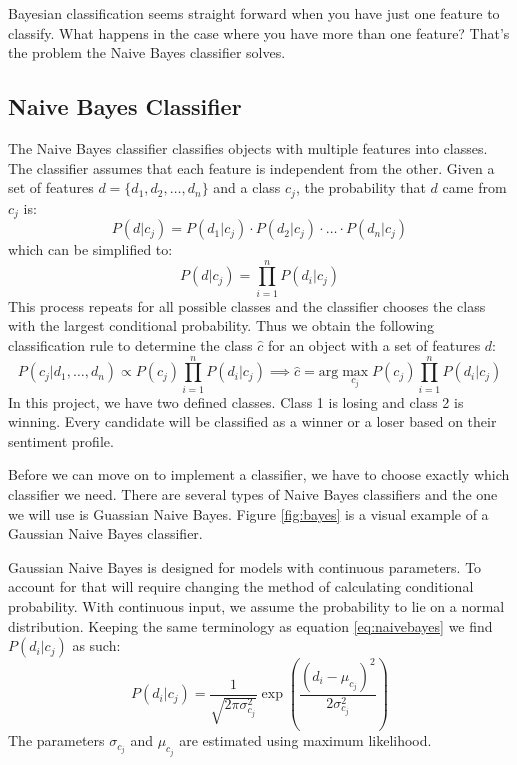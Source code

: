 \documentclass[11pt, twoside, reqno]{book}
\begin{document}
Bayesian classification seems straight forward when you have just one feature to classify. What happens in the case where you have more than one feature? That's the problem the Naive Bayes classifier solves. 

\subsection{Naive Bayes Classifier}
\hspace{0.2in}The Naive Bayes classifier classifies objects with multiple features into classes. The classifier assumes that each feature is independent from the other. Given a set of features $d = \{d_1, d_2, \dots, d_n\}$ and a class $c_j$, the probability that $d$ came from $c_j$ is:
\begin{equation}
\label{eq:naivebayes}
P(d|c_j) = P(d_1|c_j) \cdot P(d_2|c_j) \cdot \ldots \cdot P(d_n|c_j)
\end{equation}
which can be simplified to:
\begin{equation}
\label{eq:simnaivebayes}
P(d|c_j) = \prod^{n}_{i=1} P(d_i|c_j)
\end{equation}
This process repeats for all possible classes and the classifier chooses the class with the largest conditional probability. Thus we obtain the following classification rule to determine the class $\hat{c}$ for an object with a set of features $d$:
\begin{equation}
\label{eq:classrule}
P(c_j | d_1,\dots,d_n) \propto P(c_j) \prod^{n}_{i=1} P(d_i | c_j) \implies \hat{c} = \text{arg}\max_{c_j}P(c_j)\prod^{n}_{i=1}P(d_i | c_j)
\end{equation}
In this project, we have two defined classes. Class 1 is losing and class 2 is winning. Every candidate will be classified as a winner or a loser based on their sentiment profile. 

Before we can move on to implement a classifier, we have to choose exactly which classifier we need. There are several types of Naive Bayes classifiers and the one we will use is Guassian Naive Bayes. Figure \ref{fig:bayes} is a visual example of a Gaussian Naive Bayes classifier. 

Gaussian Naive Bayes is designed for models with continuous parameters. To account for that will require changing the method of calculating conditional probability. With continuous input, we assume the probability to lie on a normal distribution. Keeping the same terminology as equation \ref{eq:naivebayes} we find $P(d_i | c_j)$ as such:
\begin{equation}
\label{eq:gaussprob}
P(d_i | c_j) = \dfrac{1}{\sqrt{2\pi\sigma^{2}_{c_j}}}\exp\left(\dfrac{(d_i - \mu_{c_j})^2}{2\sigma^{2}_{c_j}}\right)
\end{equation}
The parameters $\sigma_{c_j}$ and $\mu_{c_j}$ are estimated using maximum likelihood. 
\end{document}
